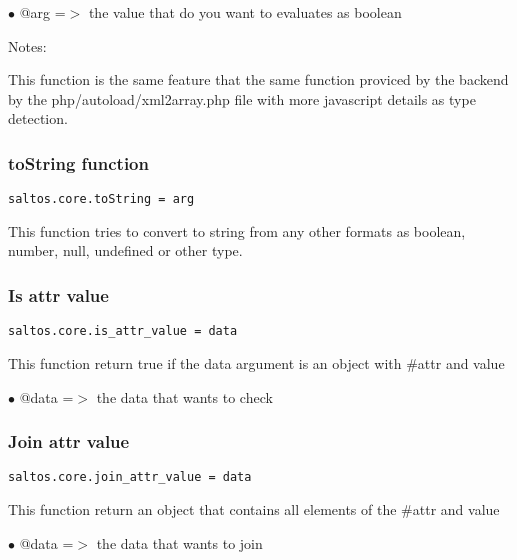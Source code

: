 \documentclass[a4paper]{article}
\begin{document}
\begin{compactitem}
\item[\color{myblue}$\bullet$] @arg =$>$ the value that do you want to evaluates as boolean
\end{compactitem}

Notes:

This function is the same feature that the same function proviced by the backend by the
php/autoload/xml2array.php file with more javascript details as type detection.

\hypertarget{toc710}{}
\subsubsection{toString function}

\begin{lstlisting}
saltos.core.toString = arg
\end{lstlisting}

This function tries to convert to string from any other formats as boolean,
number, null, undefined or other type.

\hypertarget{toc711}{}
\subsubsection{Is attr value}

\begin{lstlisting}
saltos.core.is_attr_value = data
\end{lstlisting}

This function return true if the data argument is an object with \#attr and value

\begin{compactitem}
\item[\color{myblue}$\bullet$] @data =$>$ the data that wants to check
\end{compactitem}

\hypertarget{toc712}{}
\subsubsection{Join attr value}

\begin{lstlisting}
saltos.core.join_attr_value = data
\end{lstlisting}

This function return an object that contains all elements of the \#attr and value

\begin{compactitem}
\item[\color{myblue}$\bullet$] @data =$>$ the data that wants to join
\end{compactitem}
\end{document}
